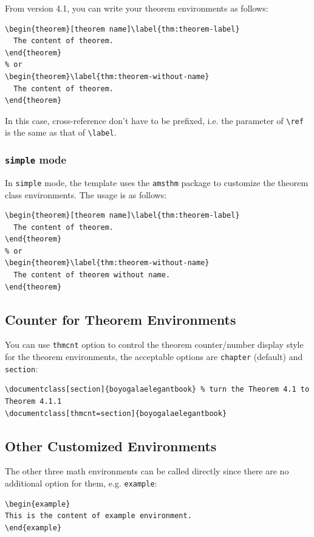 \documentclass[11pt]{boyogalaelegantbook}
\begin{document}
From version 4.1, you can write your theorem environments as follows:
\begin{lstlisting}
\begin{theorem}[theorem name]\label{thm:theorem-label}
  The content of theorem.
\end{theorem}
% or
\begin{theorem}\label{thm:theorem-without-name}
  The content of theorem.
\end{theorem}
\end{lstlisting}

In this case, cross-reference don't have to be prefixed, i.e. the parameter of \lstinline{\ref} is the same as that of \lstinline{\label}.
 
\subsubsection{\lstinline{simple} mode}

In \lstinline{simple} mode, the template uses the \lstinline{amsthm} package to customize the theorem class environments. The usage is as follows:

\begin{lstlisting}
\begin{theorem}[theorem name]\label{thm:theorem-label}
  The content of theorem.
\end{theorem}
% or 
\begin{theorem}\label{thm:theorem-without-name}
  The content of theorem without name.
\end{theorem}
\end{lstlisting}

\subsection{Counter for Theorem Environments}

You can use \lstinline{thmcnt} option to control the theorem counter/number display style for the theorem environments, the acceptable options are \lstinline{chapter} (default) and \lstinline{section}:

\begin{lstlisting}
\documentclass[section]{boyogalaelegantbook} % turn the Theorem 4.1 to Theorem 4.1.1 
\documentclass[thmcnt=section]{boyogalaelegantbook}
\end{lstlisting}


\subsection{Other Customized Environments}
The other three math environments can be called directly since there are no additional option for them, e.g. \lstinline{example}:
\begin{lstlisting}
\begin{example}
This is the content of example environment.
\end{example}
\end{lstlisting}
\end{document}
